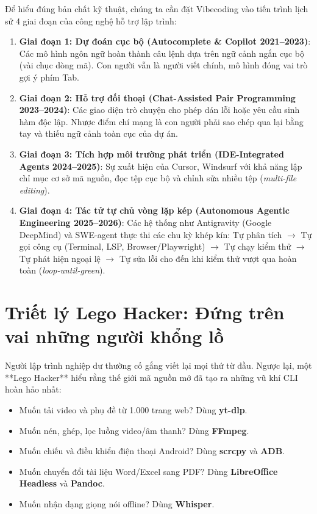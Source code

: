 \documentclass[a4paper,11pt]{report}
\begin{document}
Để hiểu đúng bản chất kỹ thuật, chúng ta cần đặt Vibecoding vào tiến trình lịch sử 4 giai đoạn của công nghệ hỗ trợ lập trình:
\begin{enumerate}[label={\arabic*.}]
    \item \textbf{Giai đoạn 1: Dự đoán cục bộ (Autocomplete \& Copilot 2021--2023)}: Các mô hình ngôn ngữ hoàn thành câu lệnh dựa trên ngữ cảnh ngắn cục bộ (vài chục dòng mã). Con người vẫn là người viết chính, mô hình đóng vai trò gợi ý phím Tab.
    \item \textbf{Giai đoạn 2: Hỗ trợ đối thoại (Chat-Assisted Pair Programming 2023--2024)}: Các giao diện trò chuyện cho phép dán lỗi hoặc yêu cầu sinh hàm độc lập. Nhược điểm chí mạng là con người phải sao chép qua lại bằng tay và thiếu ngữ cảnh toàn cục của dự án.
    \item \textbf{Giai đoạn 3: Tích hợp môi trường phát triển (IDE-Integrated Agents 2024--2025)}: Sự xuất hiện của Cursor, Windsurf với khả năng lập chỉ mục cơ sở mã nguồn, đọc tệp cục bộ và chỉnh sửa nhiều tệp (\textit{multi-file editing}).
    \item \textbf{Giai đoạn 4: Tác tử tự chủ vòng lặp kép (Autonomous Agentic Engineering 2025--2026)}: Các hệ thống như Antigravity (Google DeepMind) và SWE-agent thực thi các chu kỳ khép kín: Tự phân tích $\rightarrow$ Tự gọi công cụ (Terminal, LSP, Browser/Playwright) $\rightarrow$ Tự chạy kiểm thử $\rightarrow$ Tự phát hiện ngoại lệ $\rightarrow$ Tự sửa lỗi cho đến khi kiểm thử vượt qua hoàn toàn (\textit{loop-until-green}).
\end{enumerate}

\section{Triết lý Lego Hacker: Đứng trên vai những người khổng lồ}
Người lập trình nghiệp dư thường cố gắng viết lại mọi thứ từ đầu. Ngược lại, một **Lego Hacker** hiểu rằng thế giới mã nguồn mở đã tạo ra những vũ khí CLI hoàn hảo nhất:
\begin{itemize}[leftmargin=1.5em]
    \item Muốn tải video và phụ đề từ 1.000 trang web? Dùng \textbf{yt-dlp}.
    \item Muốn nén, ghép, lọc luồng video/âm thanh? Dùng \textbf{FFmpeg}.
    \item Muốn chiếu và điều khiển điện thoại Android? Dùng \textbf{scrcpy} và \textbf{ADB}.
    \item Muốn chuyển đổi tài liệu Word/Excel sang PDF? Dùng \textbf{LibreOffice Headless} và \textbf{Pandoc}.
    \item Muốn nhận dạng giọng nói offline? Dùng \textbf{Whisper}.
\end{itemize}
\end{document}
